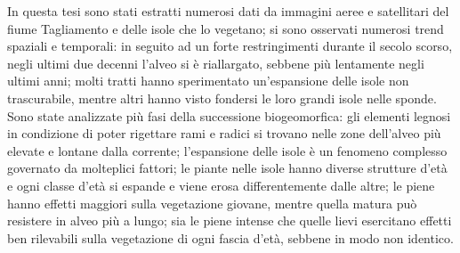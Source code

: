 In questa tesi sono stati estratti numerosi dati da immagini aeree e satellitari del fiume Tagliamento e delle isole che lo vegetano; si sono osservati numerosi trend spaziali e temporali: in seguito ad un forte restringimenti durante il secolo scorso, negli ultimi due decenni l'alveo si è riallargato, sebbene più lentamente negli ultimi anni; molti tratti hanno sperimentato un'espansione delle isole non trascurabile, mentre altri hanno visto fondersi le loro grandi isole nelle sponde.
\\
Sono state analizzate più fasi della successione biogeomorfica:
gli elementi legnosi in condizione di poter rigettare rami e radici si trovano nelle zone dell'alveo più elevate e lontane dalla corrente;
l'espansione delle isole è un fenomeno complesso governato da molteplici fattori;
le piante nelle isole hanno diverse strutture d'età e ogni classe d'età si espande e viene erosa differentemente dalle altre;
le piene hanno effetti maggiori sulla vegetazione giovane, mentre quella matura può resistere in alveo più a lungo; sia le piene intense che quelle lievi esercitano effetti ben rilevabili sulla vegetazione di ogni fascia d'età, sebbene in modo non identico.

